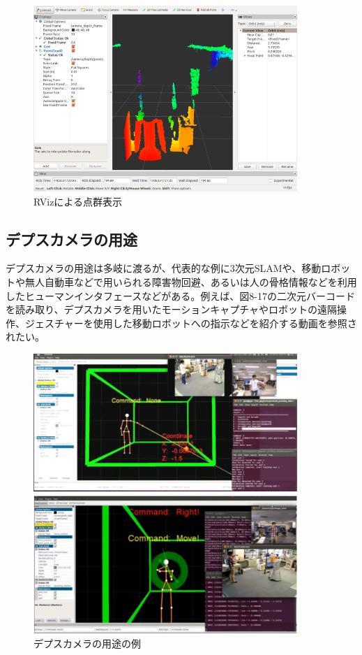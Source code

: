 \begin{figure}[htp]
  \centering
  \includegraphics[width=10cm]{pictures/chapter8/pic_08_17.png}
  \caption{RVizによる点群表示}
\end{figure}

\subsection{デプスカメラの用途}

デプスカメラの用途は多岐に渡るが、代表的な例に3次元SLAMや、移動ロボットや無人自動車などで用いられる障害物回避、あるいは人の骨格情報などを利用したヒューマンインタフェースなどがある。例えば、図8-17の二次元バーコードを読み取り、デプスカメラを用いたモーションキャプチャやロボットの遠隔操作、ジェスチャーを使用した移動ロボットへの指示などを紹介する動画を参照されたい。

\begin{figure}[htp]
  \centering
  \includegraphics[width=10cm]{pictures/chapter8/pic_08_18.png}
  \caption{デプスカメラの用途の例}
\end{figure}


